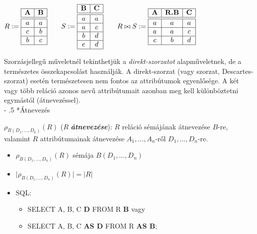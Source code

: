 \documentclass[tikz,12pt,margin=0px]{article}
\makeatletter
\renewcommand\paragraph{%
	\@startsection{paragraph}{4}{0mm}%
	{-\baselineskip}%
	{.5\baselineskip}%
	{\normalfont\normalsize\bfseries}}
\makeatother
\begin{document}
    \begin{center}
        $R := \begin{array}{|c|c|}
            \hline
            \textbf{A} & \textbf{B} \\ \hline \hline
            a & a \\ \hline
            c & b \\ \hline
            b & c \\ \hline
        \end{array} \qquad S := \begin{array}{|c|c|}
            \hline
            \textbf{B} & \textbf{C} \\ \hline \hline
            a & a \\ \hline
            a & c \\ \hline
            b & d \\ \hline
            e & d \\ \hline
        \end{array} \qquad R \bowtie S := \begin{array}{|c|c|c|}
            \hline
            \textbf{A} & \textbf{R.B} & \textbf{C} \\ \hline \hline
            a & a & a \\ \hline
            a & a  & c \\ \hline
            c & b & d \\ \hline
        \end{array}$
    \end{center}

    \noindent Szorzásjellegű műveletnél tekinthetjük a \textit{direkt-szorzatot} alapműveletnek, de a természetes összekapcsolást használják. A direkt-szorzat (vagy szorzat, Descartes-szorzat) esetén természetesen nem fontos az attribútumok egyenlősége. A két vagy több reláció azonos nevű attribútumait azonban meg kell különböztetni egymástól (átnevezéssel). \\

	\paragraph*{Átnevezés}

    $\rho_{B(D_{1}, \ldots, D_{k})}(R)$ ($R$ \emph{\textbf{átnevezése}}): $R$ reláció sémájának átnevezése $B$-re, valamint $R$ attribútumainak átnevezése $A_1, \ldots, A_n$-ről $D_{1}, \ldots, D_{n}$-re.
    \begin{itemize}
        \item $\rho_{B(D_1, \ldots, D_n)}(R)$ sémája $B(D_1, \ldots, D_n)$
        \item $\Big|\rho_{B(D_1, \ldots, D_n)}(R)\Big| = \Big|R\Big|$
        \item SQL:
        \begin{itemize}
            \item SELECT A, B, C \textbf{D} FROM R \textbf{B} vagy
            \item SELECT A, B, C \textbf{AS D} FROM R \textbf{AS B};\\
         \end{itemize}
    \end{itemize}
\end{document}
